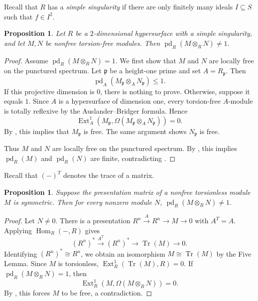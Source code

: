 \documentclass[11.05pt,a4paper]{amsart}
\newtheorem{proposition}[theorem]{Proposition}
\theoremstyle{definition}
\theoremstyle{remark}
\newcommand{\Tr}{\operatorname{Tr}}
\newcommand{\pd}{\operatorname{pd}}
\newcommand{\Ext}{\operatorname{Ext}}
\newcommand{\Hom}{\operatorname{Hom}}
\newcommand{\lo}{\longrightarrow}
\begin{document}
Recall that $R$ has a \emph{simple singularity} if there are only finitely many ideals $I\subseteq S$ such that $f\in I^2$.

\begin{proposition}
	Let $R$ be a $2$-dimensional hypersurface with a simple singularity, and let $M,N$ be nonfree torsion-free modules. Then
	\(
	\pd_R(M\otimes_R N)\ne 1.
	\)
\end{proposition}

\begin{proof}
	Assume $\pd_R(M\otimes_R N)=1$. We first show that $M$ and $N$ are locally free on the punctured spectrum.
	Let $\mathfrak p$ be a height-one prime and set $A=R_{\mathfrak p}$. Then
	\[
	\pd_A(M_{\mathfrak p}\otimes_A N_{\mathfrak p})\le1.
	\]
	If this projective dimension is $0$, there is nothing to prove. Otherwise, suppose it equals $1$. Since $A$ is a hypersurface of dimension one, every torsion-free $A$-module is totally reflexive by the Auslander–Bridger formula. Hence
	\[
	\Ext^1_A(M_{\mathfrak p},\Omega(M_{\mathfrak p}\otimes_A N_{\mathfrak p}))=0.
	\]
	By \cite[3.4]{celp}, this implies that $M_{\mathfrak p}$ is free. The same argument shows $N_{\mathfrak p}$ is free.
	
	Thus $M$ and $N$ are locally free on the punctured spectrum. By \cite[A.12]{celp}, this implies $\pd_R(M)$ and $\pd_R(N)$ are finite, contradicting \cite[3.2]{celp}.
\end{proof}
Recall that $(-)^T$ denotes the trace of a matrix.
\begin{proposition}
	Suppose the presentation matrix of a nonfree torsionless module $M$ is symmetric. Then for every nonzero module $N$,
	\(
	\pd_R(M\otimes_R N)\ne 1.
	\)
\end{proposition}

\begin{proof}
	Let $N\ne0$. There is a presentation
	\(
	R^n \xrightarrow{A} R^n \to M \to 0
	\)
	with $A^T=A$. Applying $\Hom_R(-,R)$ gives
	\[
	(R^n)^* \xrightarrow{A^T} (R^n)^* \lo \Tr(M) \lo 0.
	\]
	Identifying $(R^n)^*\cong R^n$, we obtain an isomorphism $M\cong \Tr(M)$ by the Five Lemma. Since $M$ is torsionless,
	\(
	\Ext^1_R(\Tr(M),R)=0.
	\) If $\pd_R(M\otimes_R N)=1$, then
	\[
	\Ext^1_R(M,\Omega(M\otimes_R N))=0.
	\]
	By \cite[Lemma 3.4]{celp}, this forces $M$ to be free, a contradiction.
\end{proof}
\end{document}
